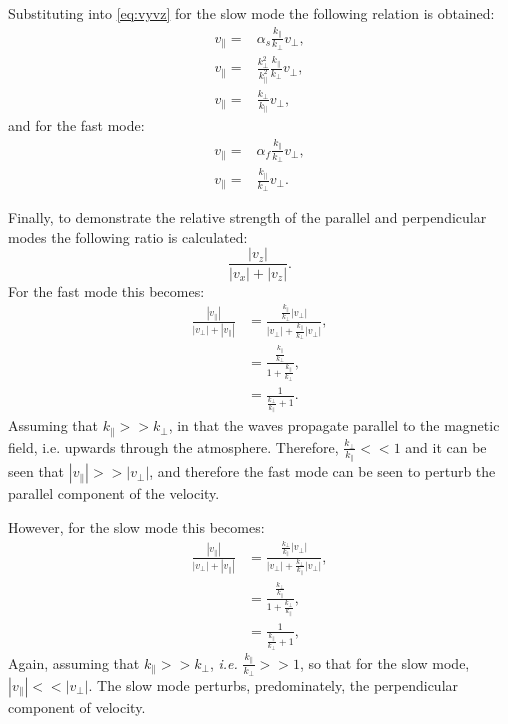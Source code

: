 Substituting into \cref{eq:vyvz} for the slow mode the following relation is obtained:
\begin{align}
    v_\parallel =& \alpha_s \frac{k_\parallel}{k_\perp}v_\perp,\\
    v_\parallel =& \frac{k^2_\perp}{k^2_\parallel}\frac{k_\parallel}{k_\perp}v_\perp,\\
    v_\parallel =& \frac{k_\perp}{k_\parallel}v_\perp,
\end{align}
and for the fast mode:
\begin{align}
    v_\parallel =& \alpha_f \frac{k_\parallel}{k_\perp}v_\perp,\\
    v_\parallel =& \frac{k_\parallel}{k_\perp}v_\perp.
\end{align}

Finally, to demonstrate the relative strength of the parallel and perpendicular modes the following ratio is calculated:
\begin{equation}
    \frac{|v_z|}{|v_x|+|v_z|}.
\end{equation}
For the fast mode this becomes:
\begin{align}
\frac{|v_\parallel|}{|v_\perp|+|v_\parallel|} &= \frac{\frac{k_\parallel}{k_\perp}|v_\perp|}{|v_\perp|+\frac{k_\parallel}{k_\perp}|v_\perp|},\\
&= \frac{\frac{k_\parallel}{k_\perp}}{1+\frac{k_\parallel}{k_\perp}},\\
&= \frac{1}{\frac{k_\perp}{k_\parallel}+1}.
\end{align}
Assuming that $k_\parallel >> k_\perp$, in that the waves propagate parallel to the magnetic field, i.e. upwards through the atmosphere.
Therefore, $\displaystyle \frac{k_\perp}{k_\parallel} << 1$ and it can be seen that $|v_\parallel| >> |v_\perp|$, and therefore the fast mode can be seen to perturb the parallel component of the velocity.

However, for the slow mode this becomes:
\begin{align}
    \frac{|v_\parallel|}{|v_\perp|+|v_\parallel|} &= \frac{\frac{k_\perp}{k_\parallel}|v_\perp|}{|v_\perp|+\frac{k_\perp}{k_\parallel}|v_\perp|},\\
    &= \frac{\frac{k_\perp}{k_\parallel}}{1+\frac{k_\perp}{k_\parallel}},\\
    &= \frac{1}{\frac{k_\parallel}{k_\perp} + 1},
\end{align}
Again, assuming that $k_\parallel >> k_\perp$, \textit{i.e.} $\displaystyle \frac{k_\parallel}{k_\perp} >> 1$, so that for the slow mode, $|v_\parallel| << |v_\perp|$.
The slow mode perturbs, predominately, the perpendicular component of velocity.  


